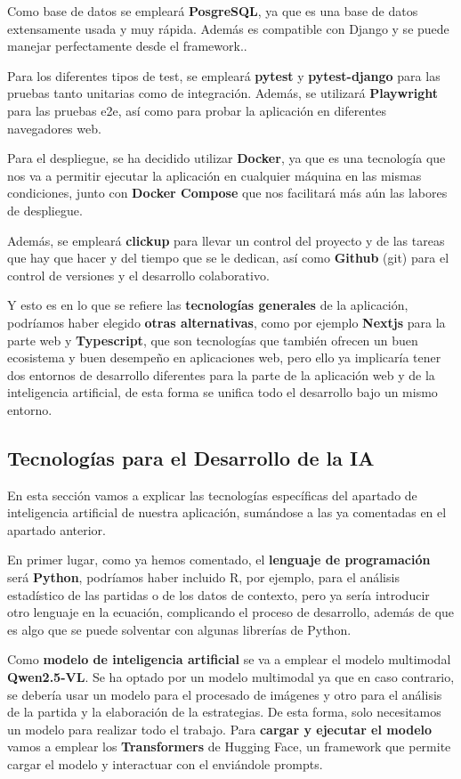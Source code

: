 Como base de datos se empleará \textbf{PosgreSQL}, ya que es una base de datos extensamente usada y muy rápida. Además es compatible con Django y se puede manejar perfectamente desde el framework..     

Para los diferentes tipos de test, se empleará \textbf{pytest} y \textbf{pytest-django} para las pruebas tanto unitarias como de integración. Además, se utilizará \textbf{Playwright} para las pruebas e2e, así como para probar la aplicación en diferentes navegadores web.

Para el despliegue, se ha decidido utilizar \textbf{Docker}, ya que es una tecnología que nos va a permitir ejecutar la aplicación en cualquier máquina en las mismas condiciones, junto con \textbf{Docker Compose} que nos facilitará más aún las labores de despliegue.

Además, se empleará \textbf{clickup} para llevar un control del proyecto y de las tareas que hay que hacer y del tiempo que se le dedican, así como \textbf{Github} (git) para el control de versiones y el desarrollo colaborativo.

Y esto es en lo que se refiere las \textbf{tecnologías generales} de la aplicación, podríamos haber elegido \textbf{otras alternativas}, como por ejemplo \textbf{Nextjs} para la parte web y \textbf{Typescript}, que son tecnologías que también ofrecen un buen ecosistema y buen desempeño en aplicaciones web, pero ello ya implicaría tener dos entornos de desarrollo diferentes para la parte de la aplicación web y de la inteligencia artificial, de esta forma se unifica todo el desarrollo bajo un mismo entorno.

\subsection{Tecnologías para el Desarrollo de la IA}
En esta sección vamos a explicar las tecnologías específicas del apartado de inteligencia artificial de nuestra aplicación, sumándose a las ya comentadas en el apartado anterior.

En primer lugar, como ya hemos comentado, el \textbf{lenguaje de programación} será \textbf{Python}, podríamos haber incluido R, por ejemplo, para el análisis estadístico de las partidas o de los datos de contexto, pero ya sería introducir otro lenguaje en la ecuación, complicando el proceso de desarrollo, además de que es algo que se puede solventar con algunas librerías de Python. 

Como \textbf{modelo de inteligencia artificial} se va a emplear el modelo multimodal \textbf{Qwen2.5-VL}. Se ha optado por un modelo multimodal ya que en caso contrario, se debería usar un modelo para el procesado de imágenes y otro para el análisis de la partida y la elaboración de la estrategias. De esta forma, solo necesitamos un modelo para realizar todo el trabajo. Para \textbf{cargar y ejecutar el modelo} vamos a emplear los \textbf{Transformers} de Hugging Face, un framework que permite cargar el modelo y interactuar con el enviándole prompts.

